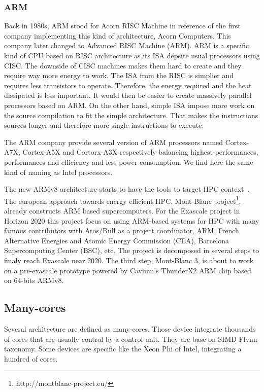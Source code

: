 \subsubsection{ARM}
Back in 1980s, ARM stood for Acorn RISC Machine in reference of the first company implementing this kind of architecture, Acorn Computers. 
This company later changed to Advanced RISC Machine (ARM). 
ARM is a specific kind of CPU based on RISC architecture as its ISA depsite usual processors using CISC.
The downside of CISC machines makes them hard to create and they require way more energy to work. 
The ISA from the RISC is simplier and requires less transistors to operate. 
Therefore, the energy required and the heat dissipated is less important. 
It would then be easier to create massively parallel processors based on ARM. 
On the other hand, simple ISA impose more work on the source compilation to fit the simple architecture. 
That makes the instructions sources longer and therefore more single instructions to execute. 

The ARM company provide several version of ARM processors named Cortex-A7X, Cortex-A5X and Cortorx-A3X respectively balancing highest-performances, performances and efficiency and less power consumption. 
We find here the same kind of naming as Intel processors. 

The new ARMv8 architecture starts to have the tools to target HPC context~\cite{rico2017arm}.
The european approach towards energy efficient HPC, Mont-Blanc project\footnote{http://montblanc-project.eu/}, already constructs ARM based supercomputers. 
For the Exascale project in Horizon 2020 this project focus on using ARM-based systems for HPC with many famous contributors with Atos/Bull as a project coordinator, ARM, French Alternative Energies and Atomic Energy Commission (CEA), Barcelona Supercomputing Center (BSC), etc.
The project is decomposed in several steps to finaly reach Exascale near 2020. 
The third step, Mont-Blanc 3, is about to work on a pre-exascale prototype powered by Cavium’s ThunderX2 ARM chip based on 64-bits ARMv8.

\subsection{Many-cores}
Several architecture are defined as many-cores. 
Those device integrate thousands of cores that are usually control by a control unit. 
They are base on SIMD Flynn taxonomy. 
Some devices are specific like the Xeon Phi of Intel, integrating a hundred of cores. 

